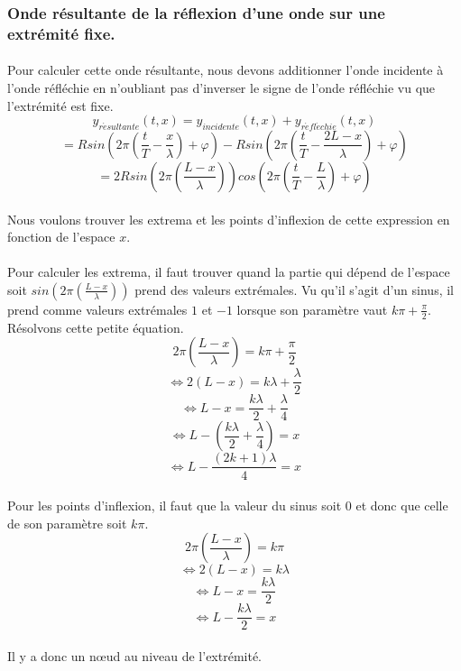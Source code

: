 \documentclass[a4paper]{article}
\begin{document}
\subsubsection{Onde résultante de la réflexion d'une onde sur une extrémité fixe.}
\paragraph{}Pour calculer cette onde résultante, nous devons additionner l'onde incidente à l'onde réfléchie en n'oubliant pas d'inverser le signe de l'onde réfléchie vu que l'extrémité est fixe.
\[y_{r\acute{e}sultante}(t,x)=y_{incidente}(t,x)+y_{r\acute{e}fl\acute{e}chie}(t,x)\]
\[=Rsin\left(2\pi \left(\frac{t}{T}-\frac{x}{\lambda}\right)+\varphi\right)-Rsin\left(2\pi \left(\frac{t}{T}-\frac{2L-x}{\lambda}\right)+\varphi\right)\]
\[=2Rsin\left(2\pi \left(\frac{L-x}{\lambda}\right)\right)cos\left(2\pi \left(\frac{t}{T}-\frac{L}{\lambda}\right)+\varphi\right)\]
\paragraph{}Nous voulons trouver les extrema et les points d'inflexion de cette expression en fonction de l'espace $x$.
\paragraph{}Pour calculer les extrema, il faut trouver quand la partie qui dépend de l'espace soit $sin\left(2\pi \left(\frac{L-x}{\lambda}\right)\right)$ prend des valeurs extrémales. Vu qu'il s'agit d'un sinus, il prend comme valeurs extrémales $1$ et $-1$ lorsque son paramètre vaut $k\pi+\frac{\pi}{2}$. Résolvons cette petite équation.
\[2\pi\left(\frac{L-x}{\lambda}\right)=k\pi+\frac{\pi}{2}\]
\[\Leftrightarrow 2\left(L-x\right)=k\lambda+\frac{\lambda}{2}\]
\[\Leftrightarrow L-x=\frac{k\lambda}{2}+\frac{\lambda}{4}\]
\[\Leftrightarrow L-\left(\frac{k\lambda}{2}+\frac{\lambda}{4}\right)=x\]
\[\Leftrightarrow L-\frac{(2k+1)\lambda}{4}=x\]
\paragraph{}Pour les points d'inflexion, il faut que la valeur du sinus soit $0$ et donc que celle de son paramètre soit $k\pi$.
\[2\pi\left(\frac{L-x}{\lambda}\right)=k\pi\]
\[\Leftrightarrow 2\left(L-x\right)=k\lambda\]
\[\Leftrightarrow L-x=\frac{k\lambda}{2}\]
\[\Leftrightarrow L-\frac{k\lambda}{2}=x\]
\paragraph{}Il y a donc un nœud au niveau de l'extrémité.
\end{document}
